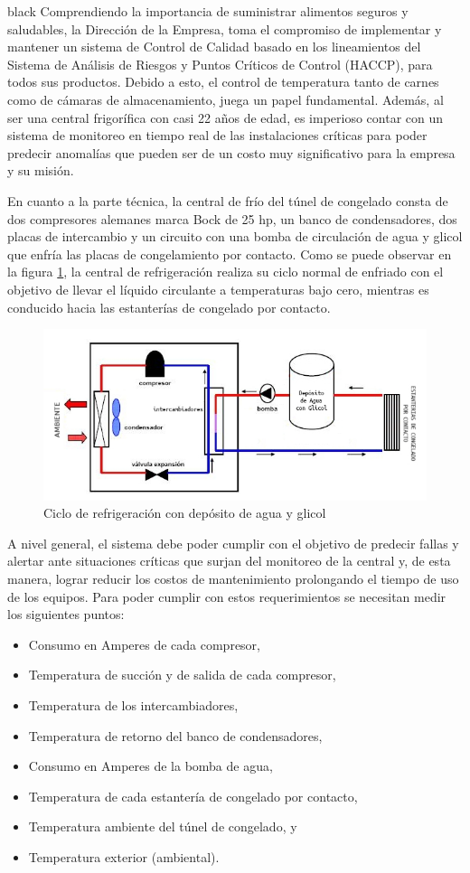 \documentclass[
11pt, %
]{charter}
\begin{document}
\begin{consigna}{black}
Comprendiendo la importancia de suministrar alimentos seguros y saludables, la Dirección de la Empresa, toma el compromiso de implementar y mantener un sistema de Control de Calidad basado en los lineamientos del Sistema de Análisis de Riesgos y Puntos Críticos de Control (HACCP), para todos sus productos. Debido a esto, el control de temperatura tanto de carnes como de cámaras de almacenamiento, juega un papel fundamental. Además, al ser una central frigorífica con casi 22 años de edad, es imperioso contar con un sistema de monitoreo en tiempo real de las instalaciones críticas para poder predecir anomalías que pueden ser de un costo muy significativo para la empresa y su misión.

En cuanto a la parte técnica, la central de frío del túnel de congelado consta de dos compresores alemanes marca Bock de 25 hp, un banco de condensadores, dos placas de intercambio y un circuito con una bomba de circulación de agua y glicol que enfría las placas de congelamiento por contacto. Como se puede observar en la figura \ref{fig:circuito_tunel}, la central de refrigeración realiza su ciclo normal de enfriado con el objetivo de llevar el líquido circulante a temperaturas bajo cero, mientras es conducido hacia las estanterías de congelado por contacto.

\begin{figure}[htpb]
\centering 
\includegraphics[width=.7\textwidth]{./Figuras/circuito_tunel.png}
\caption{Ciclo de refrigeración con depósito de agua y glicol}
\label{fig:circuito_tunel}
\end{figure}

A nivel general, el sistema debe poder cumplir con el objetivo de predecir fallas y alertar ante situaciones críticas que surjan del monitoreo de la central y, de esta manera, lograr reducir los costos de mantenimiento prolongando el tiempo de uso de los equipos. Para poder cumplir con estos requerimientos se necesitan medir los siguientes puntos:
\begin{itemize}
	\item Consumo en Amperes de cada compresor,
	\item Temperatura de succión y de salida de cada compresor,
	\item Temperatura de los intercambiadores,	
	\item Temperatura de retorno del banco de condensadores,
	\item Consumo en Amperes de la bomba de agua,
	\item Temperatura de cada estantería de congelado por contacto,
	\item Temperatura ambiente del túnel de congelado, y
	\item Temperatura exterior (ambiental).
\end{itemize}


\end{consigna}
\end{document}
